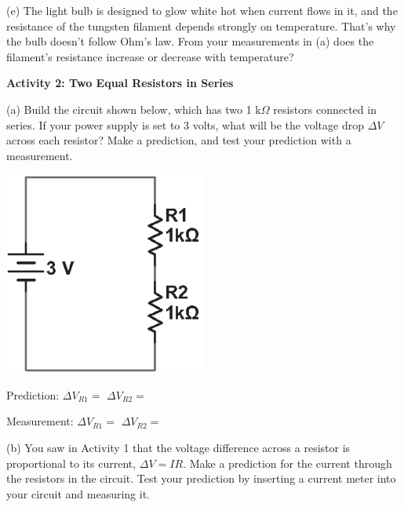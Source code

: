 (e) The light bulb is designed to glow white hot when current flows in it, and the resistance of the tungsten filament depends strongly on temperature.  That's why the bulb doesn’t follow Ohm's law.  From your measurements in (a) does the filament's resistance increase or decrease with temperature?
\answerspace{0.6 in}

\textbf{Activity 2: Two Equal Resistors in Series} \par
\nopagebreak
(a) Build the circuit shown below, which has two 1 k$\Omega$ resistors connected in series.  If your power supply is set to 3 volts, what will be the voltage drop $\Delta V$ across each resistor?  Make a prediction, and test your prediction with a measurement.

\begin{minipage}{0.4\textwidth} 
\hspace{0.5in}\includegraphics[width=0.5\textwidth]{electric_circuits2/circ_diag2_bw.eps}
\end{minipage}
\begin{minipage}{0.59\textwidth} 
\vspace{0.2 in}
Prediction: \hspace{0.4 in} $\Delta V_{R1} =$ \hspace{0.8 in} $\Delta V_{R2}=$
\vspace{0.2 in}

Measurement: \hspace{0.2 in} $\Delta V_{R1} =$ \hspace{0.8 in} $\Delta V_{R2}=$ 
\answerspace{0.2 in}
\end{minipage}

(b) You saw in Activity 1 that the voltage difference across a resistor is proportional to its current, $\Delta V=IR$.  Make a prediction for the current through the resistors in the circuit.  Test your prediction by inserting a current meter into your circuit and measuring it.  

